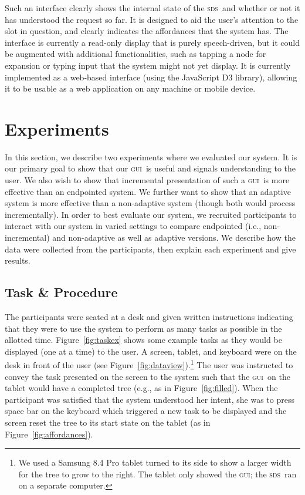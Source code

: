 \documentclass[11pt]{article}
\newcommand{\sds}[0]{\textsc{sds}}
\newcommand{\ui}[0]{\textsc{gui}}
\begin{document}
Such an interface clearly shows the internal state of the \sds\ and whether or not it has understood the request so far. It is designed to aid the user's attention to the slot in question, and clearly indicates the affordances that the system has. The interface is currently a read-only display that is purely speech-driven, but it could be augmented with additional functionalities, such as tapping a node for expansion or typing input that the system might not yet display. It is currently implemented as a web-based interface (using the JavaScript D3 library), allowing it to be usable as a web application on any machine or mobile device. 


\section{Experiments}
\label{section:experiments}

In this section, we describe two experiments where we evaluated our system. It is our primary goal to show that our \ui\ is useful and signals understanding to the user. We also wish to show that incremental presentation of such a \ui\ is more effective than an endpointed system. We further want to show that an adaptive system is more effective than a non-adaptive system (though both would process incrementally). In order to best evaluate our system, we recruited participants to interact with our system in varied settings to compare endpointed (i.e., non-incremental) and non-adaptive as well as adaptive versions. We describe how the data were collected from the participants, then explain each experiment and give results.

\subsection{Task \& Procedure} 



The participants were seated at a desk and given written instructions indicating that they were to use the system to perform as many tasks as possible in the allotted time. Figure~\ref{fig:taskex} shows some example tasks as they would be displayed (one at a time) to the user. A screen, tablet, and keyboard were on the desk in front of the user (see Figure~\ref{fig:dataview}).\footnote{We used a Samsung 8.4 Pro tablet turned to its side to show a larger width for the tree to grow to the right. The tablet only showed the \ui; the \sds\ ran on a separate computer.}  The user was instructed to convey the task presented on the screen to the system such that the \ui\ on the tablet would have a completed tree (e.g., as in Figure~\ref{fig:filled}). When the participant was satisfied that the system understood her intent, she was to press space bar on the keyboard which triggered a new task to be displayed and the screen reset the tree to its start state on the tablet (as in Figure~\ref{fig:affordances}). 
\end{document}
